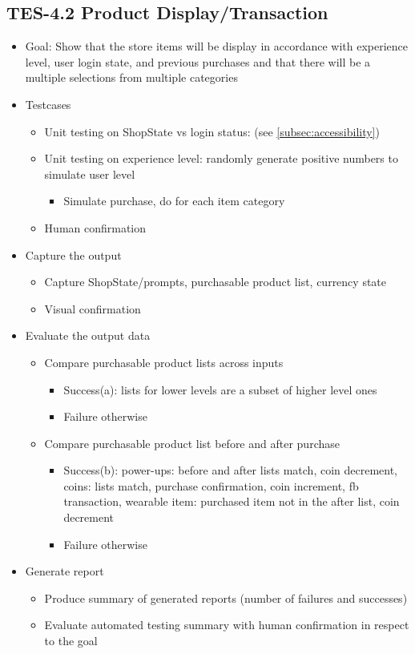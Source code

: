 \subsection{TES-4.2 Product Display/Transaction}
\begin{itemize}
\item Goal: Show that the store items will be display in accordance with experience level, user login state, and previous purchases and that there will be a multiple selections from multiple categories

\item Testcases
\begin{itemize}
\item Unit testing on ShopState vs login status: (see \ref{subsec:accessibility})
\item Unit testing on experience level: randomly generate positive numbers to simulate user level
\begin{itemize}
\item Simulate purchase, do for each item category
\end{itemize}
\item Human confirmation
\end{itemize}

\item Capture the output
\begin{itemize}
\item Capture ShopState/prompts, purchasable product list, currency state
\item Visual confirmation
\end{itemize}

\item Evaluate the output data
\begin{itemize}
\item Compare purchasable product lists across inputs
\begin{itemize}
\item Success(a): lists for lower levels are a subset of higher level ones
\item Failure otherwise
\end{itemize}
\item Compare purchasable product list before and after purchase
\begin{itemize}
\item Success(b): power-ups: before and after lists match, coin decrement, coins: lists match, purchase confirmation, coin increment, fb transaction, wearable item:	 purchased item not in the after list, coin decrement
\item Failure otherwise
\end{itemize}
\end{itemize}

\item Generate report
\begin{itemize}
\item Produce summary of generated reports (number of failures and successes)
\item Evaluate automated testing summary with human confirmation in respect to the goal
\end{itemize}
\end{itemize}


